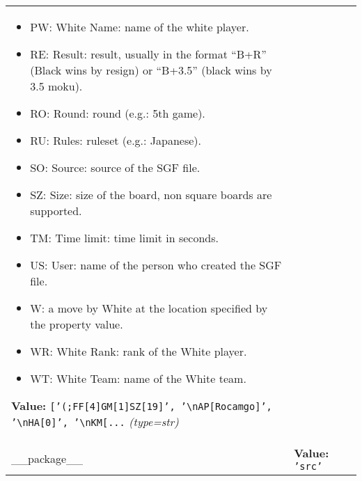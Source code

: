 \begin{longtable}{|p{\varnamewidth}|p{\vardescrwidth}|l}
\begin{itemize}
\item PW: White Name: name of the white player.

\item RE: Result: result, usually in the format ``B+R'' (Black wins by resign) or ``B+3.5'' (black wins by 3.5 moku).

\item RO: Round: round (e.g.: 5th game).

\item RU: Rules: ruleset (e.g.: Japanese).

\item SO: Source: source of the SGF file.

\item SZ: Size: size of the board, non square boards are supported.

\item TM: Time limit: time limit in seconds.

\item US: User: name of the person who created the SGF file.

\item W: a move by White at the location specified by the property value.

\item WR: White Rank: rank of the White player.

\item WT: White Team: name of the White team.

\end{itemize}

\textbf{Value:} 
{\tt \texttt{[}\texttt{'}\texttt{(;FF[4]GM[1]SZ[19]}\texttt{'}\texttt{, }\texttt{'}\texttt{{\textbackslash}nAP[Rocamgo]}\texttt{'}\texttt{, }\texttt{'}\texttt{{\textbackslash}nHA[0]}\texttt{'}\texttt{, }\texttt{'}\texttt{{\textbackslash}nKM[}\texttt{...}}            {\it (type=str)}&\\
\cline{1-2}
\raggedright \_\-\_\-p\-a\-c\-k\-a\-g\-e\-\_\-\_\- & \raggedright \textbf{Value:} 
{\tt \texttt{'}\texttt{src}\texttt{'}}&\\
\cline{1-2}
\end{longtable}

